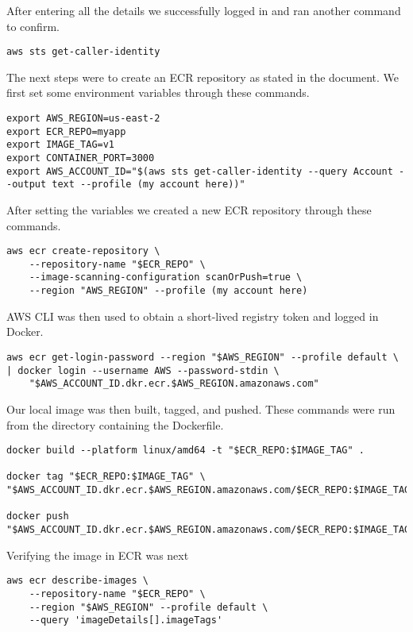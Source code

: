 \noindent After entering all the details we successfully logged in and ran another command to confirm.

\begin{verbatim}
aws sts get-caller-identity
\end{verbatim}

\noindent The next steps were to create an ECR repository as stated in the document. We first set some environment variables through these commands.

\begin{verbatim}
export AWS_REGION=us-east-2
export ECR_REPO=myapp
export IMAGE_TAG=v1
export CONTAINER_PORT=3000
export AWS_ACCOUNT_ID="$(aws sts get-caller-identity --query Account --output text --profile (my account here))"
\end{verbatim}

\noindent After setting the variables we created a new ECR repository through these commands.

\begin{verbatim}
aws ecr create-repository \
    --repository-name "$ECR_REPO" \
    --image-scanning-configuration scanOrPush=true \
    --region "AWS_REGION" --profile (my account here)
\end{verbatim}

\noindent AWS CLI was then used to obtain a short-lived registry token and logged in Docker.

\begin{verbatim}
aws ecr get-login-password --region "$AWS_REGION" --profile default \
| docker login --username AWS --password-stdin \
    "$AWS_ACCOUNT_ID.dkr.ecr.$AWS_REGION.amazonaws.com"
\end{verbatim}

\noindent Our local image was then built, tagged, and pushed. These commands were run from the directory containing the Dockerfile.

\begin{verbatim}
docker build --platform linux/amd64 -t "$ECR_REPO:$IMAGE_TAG" .

docker tag "$ECR_REPO:$IMAGE_TAG" \
"$AWS_ACCOUNT_ID.dkr.ecr.$AWS_REGION.amazonaws.com/$ECR_REPO:$IMAGE_TAG"

docker push "$AWS_ACCOUNT_ID.dkr.ecr.$AWS_REGION.amazonaws.com/$ECR_REPO:$IMAGE_TAG"
\end{verbatim}

\noindent Verifying the image in ECR was next


\begin{verbatim}
aws ecr describe-images \
    --repository-name "$ECR_REPO" \
    --region "$AWS_REGION" --profile default \
    --query 'imageDetails[].imageTags'
\end{verbatim}

